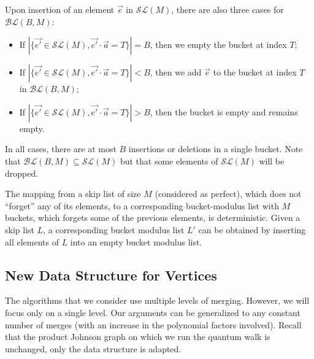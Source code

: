Upon insertion of an element $\vec{e}$ in $\mathcal{SL}(M)$, there are also three cases for $\mathcal{BL}(B, M)$:
\begin{itemize}
\item If $|\{ \vec{e'} \in \mathcal{SL}(M), \vec{e'} \cdot \vec{a} = T \}| = B$, then we empty the bucket at index $T$;
\item If $|\{ \vec{e'} \in \mathcal{SL}(M), \vec{e'} \cdot \vec{a} = T \}| < B$, then we add $\vec{e}$ to the bucket at index $T$ in $\mathcal{BL}(B,M)$;
\item If $|\{ \vec{e'} \in \mathcal{SL}(M), \vec{e'} \cdot \vec{a} = T \}| > B$, then the bucket is empty and remains empty.
\end{itemize}

In all cases, there are at most $B$ insertions or deletions in a single bucket. Note that $\mathcal{BL}(B,M) \subseteq \mathcal{SL}(M)$ but that some elements of $\mathcal{SL}(M)$ will be dropped. 

\begin{remark}
The mapping from a skip list of size $M$ (considered as perfect), which does not ``forget'' any of its elements, to a corresponding bucket-modulus list with $M$ buckets, which forgets some of the previous elements, is deterministic. Given a skip list $L$, a corresponding bucket modulus list $L'$ can be obtained by inserting all elements of $L$ into an empty bucket modulus list.
\end{remark}



\subsection{New Data Structure for Vertices}
\label{subsection:vertex-data-struct}

The algorithms that we consider use multiple levels of merging. However, we will focus only on a single level. Our arguments can be generalized to any constant number of merges (with an increase in the polynomial factors involved). Recall that the product Johnson graph on which we run the quantum walk is unchanged, only the data structure is adapted.



